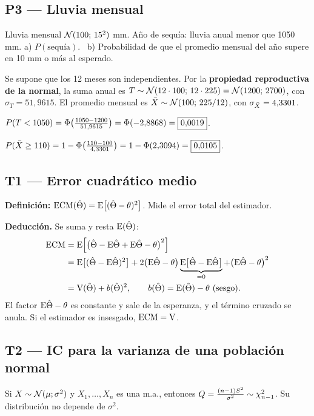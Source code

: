 \subsection{P3 --- Lluvia mensual}
\begin{enun}
Lluvia mensual $\mathcal{N}(100;\,15^2)$ mm. Año de sequía: lluvia anual menor que 1050 mm. a) $P(\text{sequía})$. \ b) Probabilidad de que el promedio mensual del año supere en 10 mm o más al esperado.
\end{enun}
\begin{metodo}
Se supone que los 12 meses son independientes. Por la \textbf{propiedad reproductiva de la normal}, la suma anual es $T\sim\mathcal{N}(12\cdot100;\,12\cdot225)=\mathcal{N}(1200;\,2700)$, con $\sigma_T=51{,}9615$. El promedio mensual es $\bar{X}\sim\mathcal{N}(100;\,225/12)$, con $\sigma_{\bar{X}}=4{,}3301$.
\end{metodo}
 $P(T<1050)=\Phi\big(\frac{1050-1200}{51{,}9615}\big)=\Phi(-2{,}8868)=\boxed{0{,}0019}$.

 $P(\bar{X}\ge110)=1-\Phi\big(\frac{110-100}{4{,}3301}\big)=1-\Phi(2{,}3094)=\boxed{0{,}0105}$.

\subsection{T1 --- Error cuadrático medio}
\textbf{Definición:} $\mathrm{ECM}(\hat\Theta)=\mathrm{E}\big[(\hat\Theta-\theta)^2\big]$. Mide el error total del estimador.

\textbf{Deducción.} Se suma y resta $\mathrm{E}(\hat\Theta)$:
\begin{align*}
\mathrm{ECM}&=\mathrm{E}\Big[\big(\hat\Theta-\mathrm{E}\hat\Theta+\mathrm{E}\hat\Theta-\theta\big)^2\Big]\\
&=\mathrm{E}\big[(\hat\Theta-\mathrm{E}\hat\Theta)^2\big]+2\big(\mathrm{E}\hat\Theta-\theta\big)\underbrace{\mathrm{E}\big[\hat\Theta-\mathrm{E}\hat\Theta\big]}_{=0}+\big(\mathrm{E}\hat\Theta-\theta\big)^2\\
&=\mathrm{V}(\hat\Theta)+b(\hat\Theta)^2,\qquad b(\hat\Theta)=\mathrm{E}(\hat\Theta)-\theta\ \text{(sesgo)}.
\end{align*}
El factor $\mathrm{E}\hat\Theta-\theta$ es constante y sale de la esperanza, y el término cruzado se anula. Si el estimador es insesgado, $\mathrm{ECM}=\mathrm{V}$.

\subsection{T2 --- IC para la varianza de una población normal}
 Si $X\sim\mathcal{N}(\mu;\sigma^2)$ y $X_1,\dots,X_n$ es una m.a., entonces $Q=\frac{(n-1)S^2}{\sigma^2}\sim\chi^2_{n-1}$. Su distribución no depende de $\sigma^2$.

